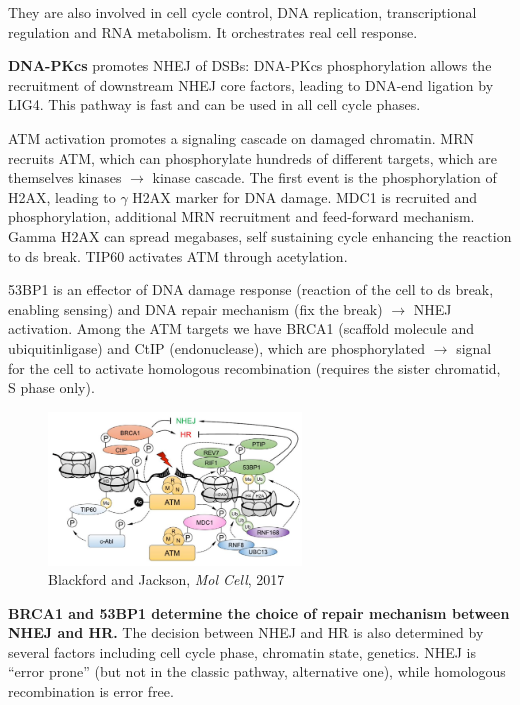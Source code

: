 They are also involved in cell cycle control, DNA replication, transcriptional regulation and RNA metabolism. It orchestrates real cell response.

\textbf{DNA-PKcs} promotes NHEJ of DSBs: DNA-PKcs phosphorylation allows the recruitment of downstream NHEJ core factors, leading to DNA-end ligation by LIG4. This pathway is fast and can be used in all cell cycle phases.

ATM activation promotes a signaling cascade on damaged chromatin. MRN recruits ATM, which can phosphorylate hundreds of different targets, which are themselves kinases $\rightarrow$ kinase cascade. The first event is the phosphorylation of H2AX, leading to $\gamma$ H2AX marker for DNA damage. MDC1 is recruited and phosphorylation, additional MRN recruitment and feed-forward mechanism. Gamma H2AX can spread megabases, self sustaining cycle enhancing the reaction to ds break. TIP60 activates ATM through acetylation.

53BP1 is an effector of DNA damage response (reaction of the cell to ds break, enabling sensing) and DNA repair mechanism (fix the break) $\rightarrow$ NHEJ activation. Among the ATM targets we have BRCA1 (scaffold molecule and ubiquitinligase) and CtIP (endonuclease), which are phosphorylated $\rightarrow$ signal for the cell to activate homologous recombination (requires the sister chromatid, S phase only).

\begin{figure}
\centering
\includegraphics[width=0.6\textwidth]{../_resources/Screen_Shot_2022-11-30_at_09-16-55.png}
\caption{Blackford and Jackson, \emph{Mol Cell}, 2017}
\end{figure}

\textbf{BRCA1 and 53BP1 determine the choice of repair mechanism between NHEJ
and HR.} The decision between NHEJ and HR is also determined by several factors including cell cycle phase, chromatin state, genetics. NHEJ is ``error prone'' (but not in the classic pathway, alternative one), while homologous recombination is error free.

